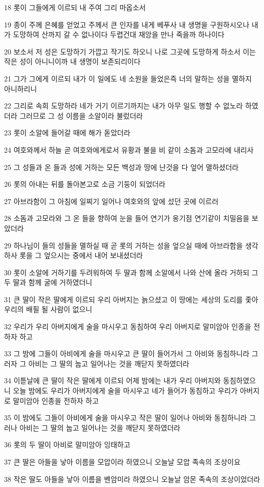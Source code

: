 \par 18 롯이 그들에게 이르되 내 주여 그리 마옵소서
\par 19 종이 주께 은혜를 얻었고 주께서 큰 인자를 내게 베푸사 내 생명을 구원하시오나 내가 도망하여 산까지 갈 수 없나이다 두렵건대 재앙을 만나 죽을까 하나이다
\par 20 보소서 저 성은 도망하기 가깝고 작기도 하오니 나로 그곳에 도망하게 하소서 이는 작은 성이 아니니이까 내 생명이 보존되리이다
\par 21 그가 그에게 이르되 내가 이 일에도 네 소원을 들었은즉 너의 말하는 성을 멸하지 아니하리니
\par 22 그리로 속희 도망하라 네가 거기 이르기까지는 내가 아무 일도 행할 수 없노라 하였더라 그러므로 그 성 이름을 소알이라 불렀더라
\par 23 롯이 소알에 들어갈 때에 해가 돋았더라
\par 24 여호와께서 하늘 곧 여호와에게로서 유황과 불을 비 같이 소돔과 고모라에 내리사
\par 25 그 성들과 온 들과 성에 거하는 모든 백성과 땅에 난것을 다 엎어 멸하셨더라
\par 26 롯의 아내는 뒤를 돌아본고로 소금 기둥이 되었더라
\par 27 아브라함이 그 아침에 일찌기 일어나 여호와의 앞에 섰던 곳에 이르러
\par 28 소돔과 고모라와 그 온 들을 향하여 눈을 들어 연기가 옹기점 연기같이 치밀음을 보았더라
\par 29 하나님이 들의 성들을 멸하실 때 곧 롯의 거하는 성을 엎으실 때에 아브라함을 생각하사 롯을 그 엎으시는 중에서 내어 보내셨더라
\par 30 롯이 소알에 거하기를 두려워하여 두 딸과 함께 소알에서 나와 산에 올라 거하되 그 두 딸과 함께 굴에 거하였더니
\par 31 큰 딸이 작은 딸에게 이르되 우리 아버지는 늙으셨고 이 땅에는 세상의 도리를 좇아 우리의 배필 될 사람이 없으니
\par 32 우리가 우리 아버지에게 술을 마시우고 동침하여 우리 아버지로 말미암아 인종을 전하자 하고
\par 33 그 밤에 그들이 아비에게 술을 마시우고 큰 딸이 들어가서 그 아비와 동침하니라 그러자 그 아비는 그 딸의 눕고 일어나는 것을 깨닫지 못하였더라
\par 34 이튿날에 큰 딸이 작은 딸에게 이르되 어제 밤에는 내가 우리 아버지와 동침하였으니 오늘 밤에도 우리가 아버지에게 술을 마시우고 네가 들어가 동침하고 우리가 아버지로 말미암아 인종을 전하자 하고
\par 35 이 밤에도 그들이 아비에게 술을 마시우고 작은 딸이 일어나 아비와 동침하니라 그러나 아비는 그 딸의 눕고 일어나는 것을 깨닫지 못하였더라
\par 36 롯의 두 딸이 아비로 말미암아 잉태하고
\par 37 큰 딸은 아들을 낳아 이름을 모압이라 하였으니 오늘날 모압 족속의 조상이요
\par 38 작은 딸도 아들을 낳아 이름을 벤암미라 하였으니 오늘날 암몬 족속의 조상이었더라


